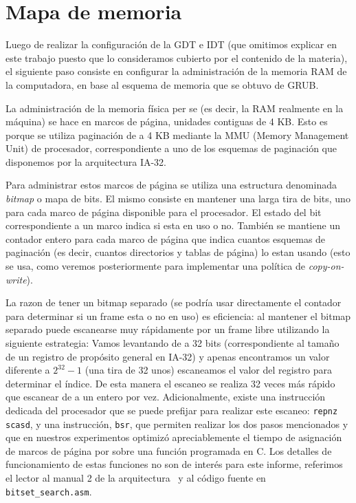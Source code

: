 \section{Mapa de memoria}
\label{sec::memory}

Luego de realizar la configuraci\'on de la GDT e IDT (que omitimos explicar en este trabajo
puesto que lo consideramos cubierto por el contenido de la materia), el siguiente paso
consiste en configurar la administraci\'on de la memoria RAM de la computadora, en base
al esquema de memoria que se obtuvo de GRUB.

La administraci\'on de la memoria f\'isica per se (es decir, la RAM realmente en la m\'aquina)
se hace en marcos de p\'agina, unidades contiguas de 4 KB. Esto es porque se utiliza paginaci\'on
de a 4 KB mediante la MMU (Memory Management Unit) de procesador, correspondiente a uno de los esquemas
de paginaci\'on que disponemos por la arquitectura IA-32.

Para administrar estos marcos de p\'agina se utiliza una estructura denominada \textit{bitmap} o mapa
de bits. El mismo consiste en mantener una larga tira de bits, uno para cada marco de p\'agina disponible
para el procesador. El estado del bit correspondiente a un marco indica si esta en uso o no. Tambi\'en
se mantiene un contador entero para cada marco de p\'agina que indica cuantos esquemas de paginaci\'on (es
decir, cuantos directorios y tablas de p\'agina) lo estan usando (esto se usa, como veremos posteriormente
para implementar una pol\'itica de \textit{copy-on-write}).

La razon de tener un bitmap separado (se podr\'ia usar directamente el contador para determinar si un frame
esta o no en uso) es eficiencia: al mantener el bitmap separado puede escanearse muy r\'apidamente por un
frame libre utilizando la siguiente estrategia: Vamos levantando de a 32 bits (correspondiente al tama\~no
de un registro de prop\'osito general en IA-32) y apenas encontramos un valor diferente a $2^{32} - 1$ (una
tira de 32 unos) escaneamos el valor del registro para determinar el \'indice. De esta manera el escaneo se
realiza 32 veces m\'as r\'apido que escanear de a un entero por vez. Adicionalmente, existe una instrucci\'on
dedicada del procesador que se puede prefijar para realizar este escaneo: \texttt{repnz scasd}, y una instrucci\'on,
\texttt{bsr}, que permiten realizar los dos pasos mencionados y que en nuestros experimentos optimiz\'o apreciablemente 
el tiempo de asignaci\'on de marcos de p\'agina por sobre una funci\'on programada en C. Los detalles de funcionamiento
de estas funciones no son de inter\'es para este informe, referimos el lector al manual 2 de la arquitectura~\cite{intel2}
y al c\'odigo fuente en \texttt{bitset\_search.asm}.

